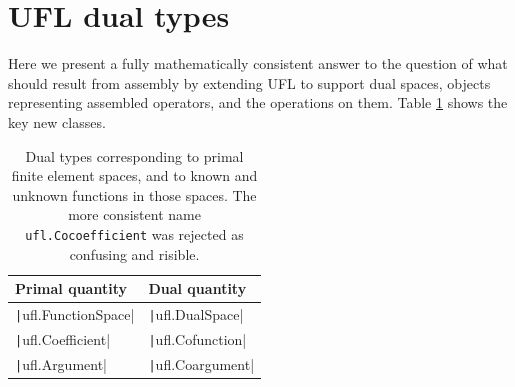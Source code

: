 \documentclass[a4paper,11pt]{article}
\begin{document}


\section{UFL dual types}

Here we present a fully mathematically consistent answer to the question of what should result from assembly by extending UFL to support dual spaces, objects representing assembled operators, and the operations on them. Table \ref{tab:dual_types} shows the key new classes. 

\begin{table}[htbp]
    \centering
    \begin{tabular}{ll}
        Primal quantity & Dual quantity \\\hline
        \texttt|ufl.FunctionSpace| & \texttt|ufl.DualSpace| \\
        \texttt|ufl.Coefficient| & \texttt|ufl.Cofunction| \\
        \texttt|ufl.Argument| & \texttt|ufl.Coargument| \\
    \end{tabular}
    \caption{Dual types corresponding to primal finite element spaces, and to known and unknown functions in those spaces. The more consistent name \texttt{ufl.Cocoefficient} was rejected as confusing and risible.}
    \label{tab:dual_types}
\end{table}
\end{document}
